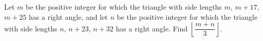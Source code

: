 Let $m$ be the positive integer for which the triangle with side lengths $m$, $m+17$, $m+25$ has a right angle, and let $n$ be the positive integer for which the triangle with side lengths $n$, $n+23$, $n+32$ has a right angle. Find $\left\lfloor\dfrac{m+n}{3}\right\rfloor$.
